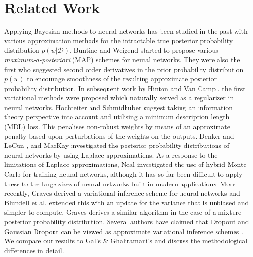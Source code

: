 \section{Related Work}
Applying Bayesian methods to neural networks has been studied in the past with various approximation methods for the intractable true posterior probability distribution $p(w|\mathcal{D})$. Buntine and Weigend \cite{buntine1991bayesian} started to propose various \textit{maximum-a-posteriori} (MAP) schemes for neural networks. They were also the first who suggested second order derivatives in the prior probability distribution $p(w)$ to encourage smoothness of the resulting approximate posterior probability distribution. In subsequent work by Hinton and Van Camp \cite{hinton1993keeping}, the first variational methods were proposed which naturally served as a regularizer in neural networks. Hochreiter and Schmidhuber \cite{hochreiter1995simplifying} suggest taking an information theory perspective into account and utilising a minimum description length (MDL) loss. This penalises non-robust weights by means of an approximate penalty based upon perturbations of the weights on the outputs. Denker and LeCun \cite{denker1991transforming}, and MacKay \cite{mackay1995probable} investigated the posterior probability distributions of neural networks by using Laplace approximations. As a response to the limitations of Laplace approximations, Neal \cite{neal2012bayesian} investigated the use of hybrid Monte Carlo for training neural networks, although it has so far been difficult to apply these to the large sizes of neural networks built in modern applications. More recently, Graves \cite{graves2011practical} derived a variational inference scheme for neural networks and Blundell et al. \cite{blundell2015weight} extended this with an update for the variance that is unbiased and simpler to compute. Graves \cite{graves2016stochastic} derives a similar algorithm in the case of a mixture posterior probability distribution. 
\newline Several authors have claimed that Dropout \cite{srivastava2014dropout} and Gaussian Dropout \cite{wang2013fast} can be viewed as approximate variational inference schemes \cite{gal2015bayesian, kingma2015variational}. We compare our results to Gal's \& Ghahramani's \cite{gal2015bayesian} and discuss the methodological differences in detail.


